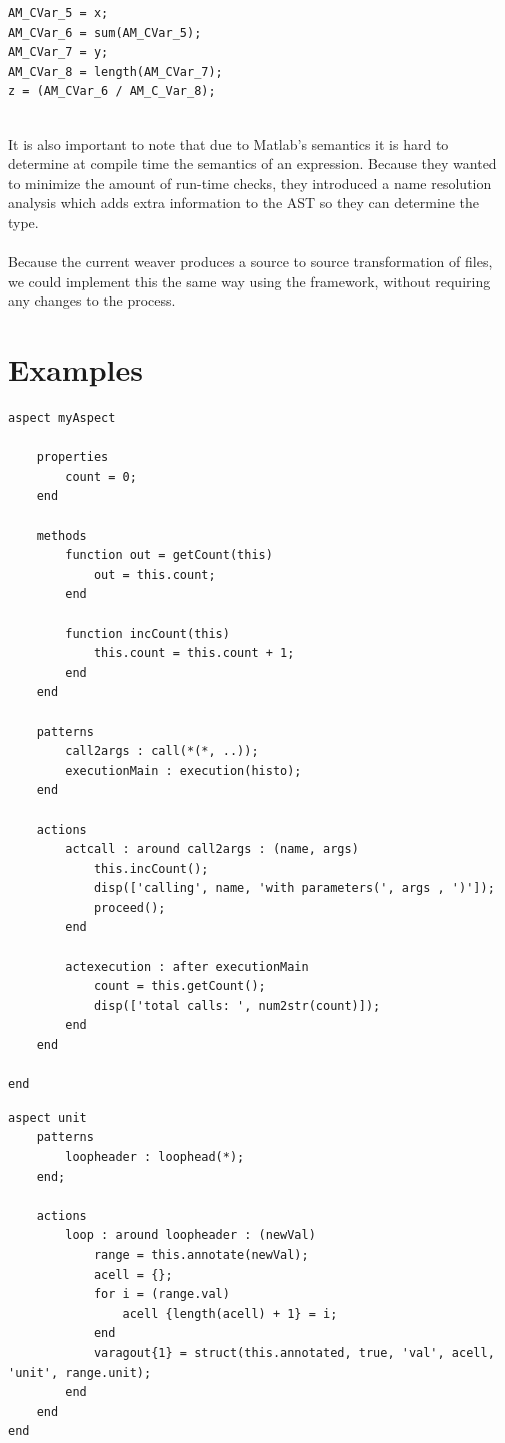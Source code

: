\documentclass[a4paper]{report}
\begin{document}
\begin{minipage}{0.45\textwidth}
\begin{lstlisting}[caption=Resulting code.]
AM_CVar_5 = x;
AM_CVar_6 = sum(AM_CVar_5);
AM_CVar_7 = y;
AM_CVar_8 = length(AM_CVar_7);
z = (AM_CVar_6 / AM_C_Var_8);
\end{lstlisting}
\end{minipage}
\\
It is also important to note that due to Matlab's semantics it is hard to determine at compile time the semantics of an expression. Because they wanted to minimize the amount of run-time checks, they introduced a name resolution analysis which adds extra information to the AST so they can determine the type.\\
\\
Because the current weaver produces a source to source transformation of files, we could implement this the same way using the framework, without requiring any changes to the process.

\section{Examples}
\begin{lstlisting}[caption=An aspect to count all calls made with at least 2 arguments., label=lst:Matlab_ExampleCalls]
aspect myAspect

	properties
		count = 0;
	end

	methods
		function out = getCount(this)
			out = this.count;
		end

		function incCount(this)
			this.count = this.count + 1;
		end
	end

	patterns
		call2args : call(*(*, ..));
		executionMain : execution(histo);
	end

	actions
		actcall : around call2args : (name, args)
			this.incCount();
			disp(['calling', name, 'with parameters(', args , ')']);
			proceed();
		end
		
		actexecution : after executionMain
			count = this.getCount();
			disp(['total calls: ', num2str(count)]);
		end
	end

end
\end{lstlisting}
\begin{lstlisting}[caption=Example of a units aspect., label=Matlab_ExampleUnits]
aspect unit
	patterns
		loopheader : loophead(*);
	end;
	
	actions
		loop : around loopheader : (newVal)
			range = this.annotate(newVal);
			acell = {};
			for i = (range.val)
				acell {length(acell) + 1} = i;
			end
			varagout{1} = struct(this.annotated, true, 'val', acell, 'unit', range.unit);
		end
	end
end
\end{lstlisting}
\end{document}
